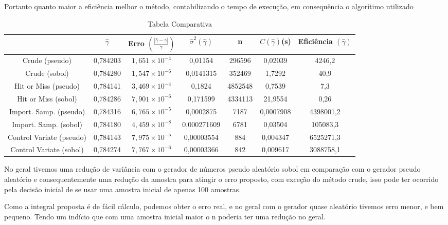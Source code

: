 \documentclass{article}
\begin{document}
Portanto quanto maior a eficiência melhor o método, contabilizando o tempo de execução, em consequência o algorítimo utilizado\newline


\begin{table}[H]
\begin{center}
    \begin{tabular}{|c|c|c|c|c|c|c|}
    \hline
                        & $\hat{\gamma}$ & Erro $\left( \frac{|\hat{\gamma}-\gamma|}{\gamma}\right)$ & $\hat{\sigma}^2(\hat{\gamma})$  & n       & $C(\hat{\gamma})$(s)    & Eficiência $(\hat{\gamma})$ \\ \hline
    Crude (pseudo)       & 0,784203 & $1,651\times10^{-4}$      & 0,01154    & 296596  & 0,02039   & 4246,2    \\ \hline
    Crude (sobol)       & 0,784280 & $1,547\times10^{-6}$      & 0,0141315    & 352469  & 1,7292   & 40,9    \\ \hline
    Hit or Miss (pseudo) & 0,784141 & $3,469\times10^{-4}$ & 0,1824     & 4852548 & 0,7539    & 7,3       \\ \hline
    Hit or Miss (sobol) & 0,784286 & $7,901\times10^{-6}$ & 0,171599     & 4334113 & 21,9554    & 0,26       \\ \hline
    Import. Samp. (pseudo) & 0,784316 & $6,765\times10^{-5}$ & 0,0002875  & 7187    & 0,0007908 & 4398001,2  \\ \hline
    Import. Samp. (sobol) & 0,784180 & $4,459\times10^{-8}$ & 0,000271609  & 6781    & 0,03504 & 105083,3  \\ \hline
    Control Variate (pseudo)   & 0,784143 & $7,975\times10^{-5}$ & 0,00003554 & 884     & 0,004347  & 6525271,3  \\ \hline
    Control Variate (sobol)    & 0,784274 & $7,767\times10^{-6}$ & 0,00003366 & 842     & 0,009617  & 3088758,1  \\ \hline
    \end{tabular}
    \caption{Tabela Comparativa}
    \label{tab:comparacao}
\end{center}
\end{table}

No geral tivemos uma redução de variância com o gerador de números pseudo aleatório sobol em comparação com o gerador pseudo aleatório e consequentemente uma redução da amostra para atingir o erro proposto, com exceção do método crude, isso pode ter ocorrido pela decisão inicial de se usar uma amostra inicial de apenas 100 amostras.

Como a integral proposta é de fácil cálculo, podemos obter o erro real, e no geral com o gerador quase aleatório tivemos erro menor, e bem pequeno. Tendo um indício que com uma amostra inicial maior o n poderia ter uma redução no geral.
\end{document}

